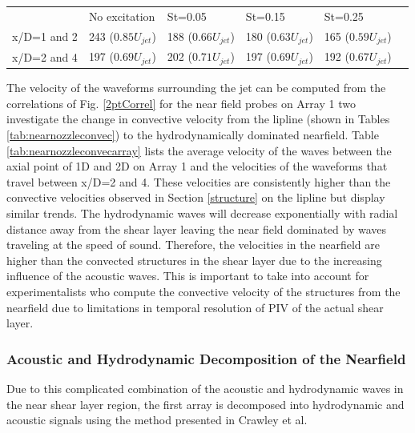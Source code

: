\documentclass[english]{aiaa-tc}
\begin{document}
\begin{center}
	\begin{tabular}{|l|l|l|l|l|l}
		 & No excitation & St=0.05 & St=0.15 & St=0.25 \\
		x/D=1 and 2 & 243 ($0.85U_{jet}$) & 188 ($0.66U_{jet}$) & 180 ($0.63U_{jet}$) & 165 ($0.59U_{jet}$) \\
		x/D=2 and 4 & 197 ($0.69U_{jet}$) & 202 ($0.71U_{jet}$) & 197 ($0.69U_{jet}$) & 192 ($0.67U_{jet}$) \\
	\end{tabular}
	\label{tab:nearnozzleconvecarray}
\end{center}
The velocity of the waveforms surrounding the jet can be computed from the correlations of Fig. \ref{2ptCorrel} for the near field probes on Array 1 two investigate the change in convective velocity from the lipline (shown in Tables \ref{tab:nearnozzleconvec}) to the hydrodynamically dominated nearfield. Table \ref{tab:nearnozzleconvecarray} lists the average velocity of the waves between the axial point of 1D and 2D on Array 1 and the velocities of the waveforms that travel between x/D=2 and 4. These velocities are consistently higher than the convective velocities observed in Section \ref{structure} on the lipline but display similar trends. The hydrodynamic waves will decrease exponentially with radial distance away from the shear layer leaving the near field dominated by waves traveling at the speed of sound. Therefore, the velocities in the nearfield are higher than the convected structures in the shear layer due to the increasing influence of the acoustic waves. This is important to take into account for experimentalists who compute the convective velocity of the structures from the nearfield due to limitations in temporal resolution of PIV of the actual shear layer. 

\subsubsection{Acoustic and Hydrodynamic Decomposition of the Nearfield}
Due to this complicated combination of the acoustic and hydrodynamic waves in the near shear layer region, the first array is decomposed into hydrodynamic and acoustic signals using the method presented in Crawley et al. \cite{Crawley2014}
\end{document}
